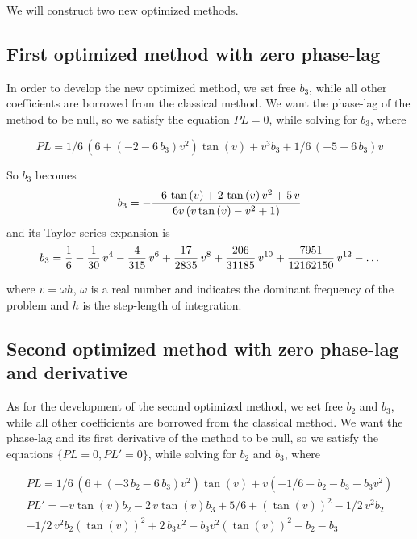\documentclass[numreferences]{kluwer}
\begin{document}
\begin{article}
\noindent We will construct two new optimized methods.

\subsection{First optimized method with zero phase-lag}
\label{Constr1}

In order to develop the new optimized method, we set free $b_3$, while all other coefficients are borrowed from the classical method. We want the phase-lag of the method to be null, so we satisfy the equation $PL=0$, while solving for $b_3$, where

$$PL = 1/6\, \left( 6+ \left( -2-6\,b_{{3}} \right) {v}^{2} \right) \tan  \left( v \right) +{v}^{3}b_{{3}}+1/6\, \left( -5-6\,b_{{3}} \right) v$$

So $b_3$ becomes
$${\displaystyle} b_3 = -{\frac {-6\,\tan \left( v \right) +2\,\tan \left( v \right) {v}^{2}+5\,v}{6 v \left( v\tan \left( v \right) -{v}^{2}+1 \right) }}$$
and its Taylor series expansion is
$${\displaystyle} b_3 = \frac{1}{6}-\frac{1}{30}\,{v}^{4}-{\frac {4}{315}}\,{v}^{6}+{\frac {17}{2835}}\,{v}^{8}+{\frac {206}{31185}}\,{v}^{10}+{\frac {7951}{12162150}}\,{v}^{12}-\ldots$$

\noindent where  $v=\omega h$, $\omega$ is a real number and indicates the dominant frequency of the problem and $h$ is the step-length of integration.

\subsection{Second optimized method with zero phase-lag and derivative}
\label{Constr1}

As for the development of the second optimized method, we set free $b_2$ and $b_3$, while all other coefficients are borrowed from the classical method. We want the phase-lag and its first derivative of the method to be null, so we satisfy the equations $\{PL=0, PL'=0\}$, while solving for $b_2$ and $b_3$, where

\begin{equation}
\begin{array}{l}
PL = 1/6\, \left( 6+ \left( -3\,b_{{2}}-6\,b_{{3}} \right) {v}^{2} \right) \tan \left( v \right) +v \left( -1/6-b_{{2}}-b_{{3}}+b_{{3}}{v}^{2}  \right)\\
PL' = -v\tan \left( v \right) b_{{2}}-2\,v\tan \left( v \right) b_{{3}}+5/6+\left( \tan \left( v \right)  \right) ^{2}-1/2\,{v}^{2}b_{{2}}\\
-1/2\,{v}^{2}b_{{2}} \left( \tan \left( v \right)  \right) ^{2}+2\,b_{{3}}{v}^{2}-b_{{3}}{v}^{2} \left( \tan \left( v \right)  \right) ^{2}-b_{{2}}
-b_{{3}}
\end{array}
\end{equation}


\end{article}
\end{document}
